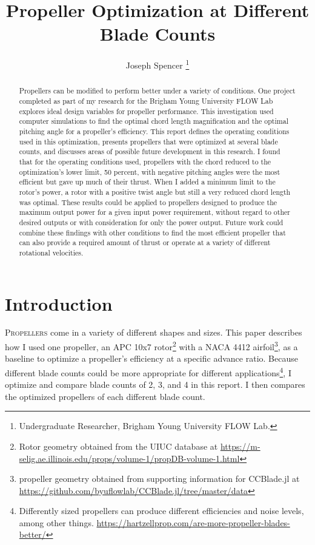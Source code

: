\documentclass[journal ]{new-aiaa}
\title{Propeller Optimization at Different Blade Counts}
\author{Joseph Spencer \footnote{Undergraduate Researcher, Brigham Young University FLOW Lab.}}
\affil{Brigham Young University, Provo, Utah, 84601}
\begin{document}
\maketitle

\begin{abstract}

Propellers can be modified to perform better under a variety of conditions. One project completed as part of my research for the Brigham Young University FLOW Lab explores ideal design variables for propeller performance. This investigation used computer simulations to find the optimal chord length magnification and the optimal pitching angle for a propeller's efficiency. This report defines the operating conditions used in this optimization, presents propellers that were optimized at several blade counts, and discusses areas of possible future development in this research. I found that for the operating conditions used, propellers with the chord reduced to the optimization's lower limit, 50 percent, with negative pitching angles were the most efficient but gave up much of their thrust. When I added a minimum limit to the rotor's power, a rotor with a positive twist angle but still a very reduced chord length was optimal. These results could be applied to propellers designed to produce the maximum output power for a given input power requirement, without regard to other desired outputs or with consideration for only the power output. Future work could combine these findings with other conditions to find the most efficient propeller that can also provide a required amount of thrust or operate at a variety of different rotational velocities.

\end{abstract}


\section{Introduction}

\lettrine{P}{ropellers} come in a variety of different shapes and sizes. This paper describes how I used one propeller, an APC 10x7 rotor\footnote{Rotor geometry obtained from the UIUC database at \url{https://m-selig.ae.illinois.edu/props/volume-1/propDB-volume-1.html}} with a NACA 4412 airfoil\footnote{propeller geometry obtained from supporting information for CCBlade.jl at \url{https://github.com/byuflowlab/CCBlade.jl/tree/master/data}}, as a baseline to optimize a propeller's efficiency at a specific advance ratio. Because different blade counts could be more appropriate for different applications\footnote{Differently sized propellers can produce different efficiencies and noise levels, among other things. \url{https://hartzellprop.com/are-more-propeller-blades-better/}}, I optimize and compare blade counts of 2, 3, and 4 in this report. I then compares the optimized propellers of each different blade count.
\end{document}
